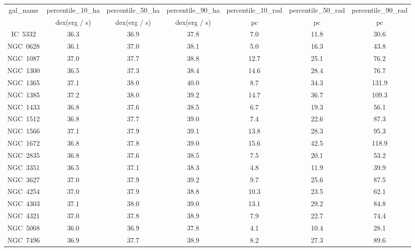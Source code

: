 \begin{table}
\begin{tabular}{ccccccc}
gal_name & percentile_10_ha & percentile_50_ha & percentile_90_ha & percentile_10_rad & percentile_50_rad & percentile_90_rad \\
 & dex(erg / s) & dex(erg / s) & dex(erg / s) & $\mathrm{pc}$ & $\mathrm{pc}$ & $\mathrm{pc}$ \\
IC~5332 & 36.3 & 36.9 & 37.8 & 7.0 & 11.8 & 30.6 \\
NGC~0628 & 36.1 & 37.0 & 38.1 & 5.0 & 16.3 & 43.8 \\
NGC~1087 & 37.0 & 37.7 & 38.8 & 12.7 & 25.1 & 76.2 \\
NGC~1300 & 36.5 & 37.3 & 38.4 & 14.6 & 28.4 & 76.7 \\
NGC~1365 & 37.1 & 38.0 & 40.0 & 8.7 & 34.3 & 131.9 \\
NGC~1385 & 37.2 & 38.0 & 39.2 & 14.7 & 36.7 & 109.3 \\
NGC~1433 & 36.8 & 37.6 & 38.5 & 6.7 & 19.3 & 56.1 \\
NGC~1512 & 36.8 & 37.7 & 39.0 & 7.4 & 22.6 & 87.3 \\
NGC~1566 & 37.1 & 37.9 & 39.1 & 13.8 & 28.3 & 95.3 \\
NGC~1672 & 36.8 & 37.8 & 39.0 & 15.6 & 42.5 & 118.9 \\
NGC~2835 & 36.8 & 37.6 & 38.5 & 7.5 & 20.1 & 53.2 \\
NGC~3351 & 36.5 & 37.1 & 38.3 & 4.8 & 11.9 & 39.9 \\
NGC~3627 & 37.0 & 37.9 & 39.2 & 9.7 & 25.6 & 87.5 \\
NGC~4254 & 37.0 & 37.9 & 38.8 & 10.3 & 23.5 & 62.1 \\
NGC~4303 & 37.1 & 38.0 & 39.0 & 13.1 & 29.2 & 84.8 \\
NGC~4321 & 37.0 & 37.8 & 38.9 & 7.9 & 22.7 & 74.4 \\
NGC~5068 & 36.0 & 36.9 & 37.8 & 4.1 & 10.4 & 28.1 \\
NGC~7496 & 36.9 & 37.7 & 38.9 & 8.2 & 27.3 & 89.6 \\
\end{tabular}
\end{table}
